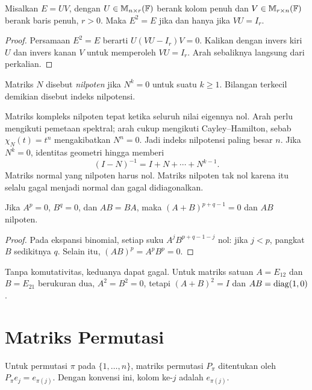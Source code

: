 \begin{prop}
    \label{khusus:faktor-idempoten}
    Misalkan $E=UV$, dengan $U\in\mathbb{M}_{n\times r}(\mathbb{F})$
    berank kolom penuh dan $V\in\mathbb{M}_{r\times n}(\mathbb{F})$ berank
    baris penuh, $r>0$. Maka $E^2=E$ jika dan hanya jika $VU=I_r$.
\end{prop}
\begin{proof}
    Persamaan $E^2=E$ berarti $U(VU-I_r)V=0$.
    Kalikan dengan invers kiri $U$ dan invers kanan $V$ untuk
    memperoleh $VU=I_r$. Arah sebaliknya langsung dari perkalian.
\end{proof}

\begin{definisi}
    Matriks $N$ disebut \emph{nilpoten} jika $N^k=0$ untuk suatu
    $k\ge1$. Bilangan terkecil demikian disebut indeks nilpotensi.
\end{definisi}

Matriks kompleks nilpoten tepat ketika seluruh nilai eigennya nol.
Arah perlu mengikuti pemetaan spektral; arah cukup mengikuti
Cayley--Hamilton, sebab $\chi_N(t)=t^n$ mengakibatkan $N^n=0$.
Jadi indeks nilpotensi paling besar $n$.
Jika $N^k=0$, identitas geometri hingga memberi
\[
    (I-N)^{-1}=I+N+\cdots+N^{k-1}.
\]
Matriks normal yang nilpoten harus nol. Matriks nilpoten tak nol
karena itu selalu gagal menjadi normal dan gagal didiagonalkan.

\begin{prop}
    \label{khusus:nilpoten-komutatif}
    Jika $A^p=0$, $B^q=0$, dan $AB=BA$, maka
    $(A+B)^{p+q-1}=0$ dan $AB$ nilpoten.
\end{prop}
\begin{proof}
    Pada ekspansi binomial, setiap suku $A^jB^{p+q-1-j}$ nol:
    jika $j<p$, pangkat $B$ sedikitnya $q$.
    Selain itu, $(AB)^p=A^pB^p=0$.
\end{proof}

Tanpa komutativitas, keduanya dapat gagal. Untuk matriks satuan
$A=E_{12}$ dan $B=E_{21}$ berukuran dua, $A^2=B^2=0$,
tetapi $(A+B)^2=I$ dan $AB=\operatorname{diag}(1,0)$.

\section{Matriks Permutasi}
\label{khusus:permutasi}

\begin{definisi}
    Untuk permutasi $\pi$ pada $\{1,\ldots,n\}$, matriks permutasi
    $P_\pi$ ditentukan oleh $P_\pi e_j=e_{\pi(j)}$.
    Dengan konvensi ini, kolom ke-$j$ adalah $e_{\pi(j)}$.
\end{definisi}

